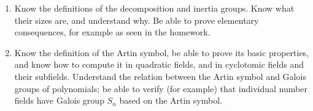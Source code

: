 \documentclass[12pt]{article}
\begin{document}
\begin{enumerate}
\item
Know the definitions of the decomposition and inertia groups. Know what their sizes are, and understand why. Be able to
prove elementary consequences, for example as seen in the homework.

\item
Know the definition of the Artin symbol, be able to prove its basic properties, and know how to compute it in quadratic fields,
and in cyclotomic fields and their subfields. Understand the relation between the Artin symbol and Galois groups of polynomials;
be able to verify (for example) that individual number fields have Galois group $S_n$ based on the Artin symbol.

\end{enumerate}
\end{document}
